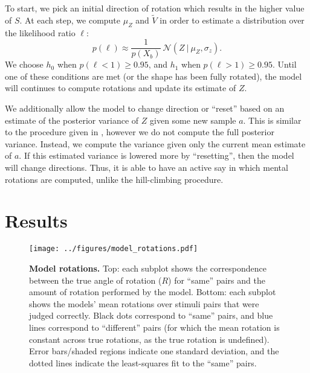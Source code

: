 \documentclass{article} %
\begin{document}
To start, we pick an initial direction of rotation which results in
the higher value of $S$. At each step, we compute $\mu_Z$ and
$\tilde{V}$ in order to estimate a distribution over the likelihood
ratio $\ell$:
\begin{equation*}
p(\ell)\approx\frac{1}{p(X_b)}\ \mathcal{N}(Z\ \vert\ \mu_Z, \sigma_z).
\end{equation*}
We choose $h_0$ when $p(\ell < 1)\geq 0.95$, and $h_1$ when $p(\ell >
1)\geq 0.95$. Until one of these conditions are met (or the shape has
been fully rotated), the model will continues to compute rotations and
update its estimate of $Z$. 

We additionally allow the model to change direction or ``reset'' based
on an estimate of the posterior variance of $Z$ given some new sample
$a$. This is similar to the procedure given in \cite{Osborne:2012tm},
however we do not compute the full posterior variance. Instead, we
compute the variance given only the current mean estimate of $a$. If
this estimated variance is lowered more by ``resetting'', then the
model will change directions. Thus, it is able to have an active say
in which mental rotations are computed, unlike the hill-climbing
procedure.


\section{Results}

\begin{figure}[t]
  \centering
  \texttt{[image: ../figures/model\_rotations.pdf]}
  \caption{\textbf{Model rotations.} Top: each subplot shows the
    correspondence between the true angle of rotation ($R$) for
    ``same'' pairs and the amount of rotation performed by the
    model. Bottom: each subplot shows the models' mean rotations over
    stimuli pairs that were judged correctly. Black dots correspond to
    ``same'' pairs, and blue lines correspond to ``different'' pairs
    (for which the mean rotation is constant across true rotations, as
    the true rotation is undefined). Error bars/shaded regions
    indicate one standard deviation, and the dotted lines indicate the
    least-squares fit to the ``same'' pairs.}
  \label{fig:rotations}
\end{figure}
\end{document}

